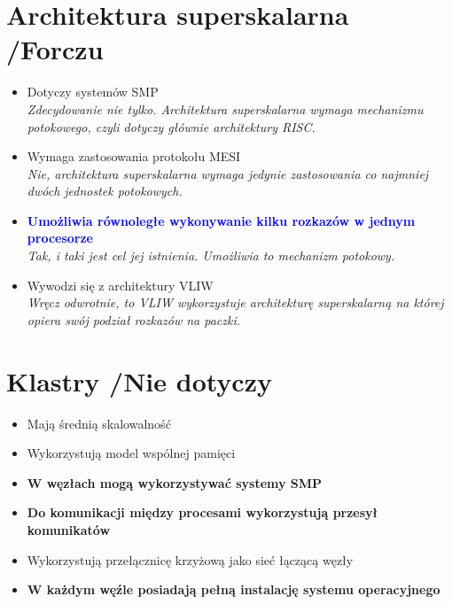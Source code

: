 \section{Architektura superskalarna {\small /Forczu}}
	\begin{itemize}
    \item Dotyczy systemów SMP\\
    {\small \emph{Zdecydowanie nie tylko. Architektura superskalarna wymaga mechanizmu potokowego, czyli dotyczy głównie architektury RISC.}}
    \item Wymaga zastosowania protokołu MESI\\
    {\small \emph{Nie, architektura superskalarna wymaga jedynie zastosowania co najmniej dwóch jednostek potokowych.}}
    \item \textcolor{Blue}{\textbf{Umożliwia równoległe wykonywanie kilku rozkazów w jednym procesorze}}\\
    {\small \emph{Tak, i taki jest cel jej istnienia. Umożliwia to mechanizm potokowy.}}
    \item Wywodzi się z architektury VLIW\\
    {\small \emph{Wręcz odwrotnie, to VLIW wykorzystuje architekturę superskalarną na której opiera swój podział rozkazów na paczki.}}
    \end{itemize}

\section{Klastry {\small /Nie dotyczy}}
	\begin{itemize}
    \item Mają średnią skalowalność
    \item Wykorzystują model wspólnej pamięci
    \item \textbf{W węzłach mogą wykorzystywać systemy SMP}
    \item \textbf{Do komunikacji między procesami wykorzystują przesył komunikatów}
    \item Wykorzystują przełącznicę krzyżową jako sieć łączącą węzły
    \item \textbf{W każdym węźle posiadają pełną instalację systemu operacyjnego}
    \end{itemize}

